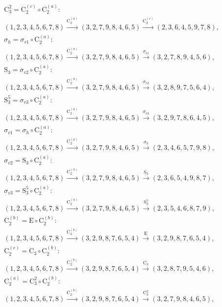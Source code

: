 \begin{align*}
& \mathrm{C}_{3}^{2} = \mathrm{C}_{2}^{(c)} \circ \mathrm{C}_{2}^{(a)}:\; \\& (1,2,3,4,5,6,7,8) \xrightarrow{\mathrm{C}_{2}^{(a)}} (3,2,7,9,8,4,6,5) \xrightarrow{\mathrm{C}_{2}^{(c)}} (2,3,6,4,5,9,7,8), \\
& \sigma_{h} = \sigma_{v1} \circ \mathrm{C}_{2}^{(a)}:\; \\& (1,2,3,4,5,6,7,8) \xrightarrow{\mathrm{C}_{2}^{(a)}} (3,2,7,9,8,4,6,5) \xrightarrow{\sigma_{v1}} (3,2,7,8,9,4,5,6), \\
& \mathrm{S}_{3} = \sigma_{v2} \circ \mathrm{C}_{2}^{(a)}:\; \\& (1,2,3,4,5,6,7,8) \xrightarrow{\mathrm{C}_{2}^{(a)}} (3,2,7,9,8,4,6,5) \xrightarrow{\sigma_{v2}} (3,2,8,9,7,5,6,4), \\
& \mathrm{S}_{3}^{5} = \sigma_{v3} \circ \mathrm{C}_{2}^{(a)}:\; \\& (1,2,3,4,5,6,7,8) \xrightarrow{\mathrm{C}_{2}^{(a)}} (3,2,7,9,8,4,6,5) \xrightarrow{\sigma_{v3}} (3,2,9,7,8,6,4,5), \\
& \sigma_{v1} = \sigma_{h} \circ \mathrm{C}_{2}^{(a)}:\; \\& (1,2,3,4,5,6,7,8) \xrightarrow{\mathrm{C}_{2}^{(a)}} (3,2,7,9,8,4,6,5) \xrightarrow{\sigma_{h}} (2,3,4,6,5,7,9,8), \\
& \sigma_{v2} = \mathrm{S}_{3} \circ \mathrm{C}_{2}^{(a)}:\; \\& (1,2,3,4,5,6,7,8) \xrightarrow{\mathrm{C}_{2}^{(a)}} (3,2,7,9,8,4,6,5) \xrightarrow{\mathrm{S}_{3}} (2,3,6,5,4,9,8,7), \\
& \sigma_{v3} = \mathrm{S}_{3}^{5} \circ \mathrm{C}_{2}^{(a)}:\; \\& (1,2,3,4,5,6,7,8) \xrightarrow{\mathrm{C}_{2}^{(a)}} (3,2,7,9,8,4,6,5) \xrightarrow{\mathrm{S}_{3}^{5}} (2,3,5,4,6,8,7,9), \\
& \mathrm{C}_{2}^{(b)} = \mathrm{E} \circ \mathrm{C}_{2}^{(b)}:\; \\& (1,2,3,4,5,6,7,8) \xrightarrow{\mathrm{C}_{2}^{(b)}} (3,2,9,8,7,6,5,4) \xrightarrow{\mathrm{E}} (3,2,9,8,7,6,5,4), \\
& \mathrm{C}_{2}^{(c)} = \mathrm{C}_{3} \circ \mathrm{C}_{2}^{(b)}:\; \\& (1,2,3,4,5,6,7,8) \xrightarrow{\mathrm{C}_{2}^{(b)}} (3,2,9,8,7,6,5,4) \xrightarrow{\mathrm{C}_{3}} (3,2,8,7,9,5,4,6), \\
& \mathrm{C}_{2}^{(a)} = \mathrm{C}_{3}^{2} \circ \mathrm{C}_{2}^{(b)}:\; \\& (1,2,3,4,5,6,7,8) \xrightarrow{\mathrm{C}_{2}^{(b)}} (3,2,9,8,7,6,5,4) \xrightarrow{\mathrm{C}_{3}^{2}} (3,2,7,9,8,4,6,5), \\

\end{align*}
